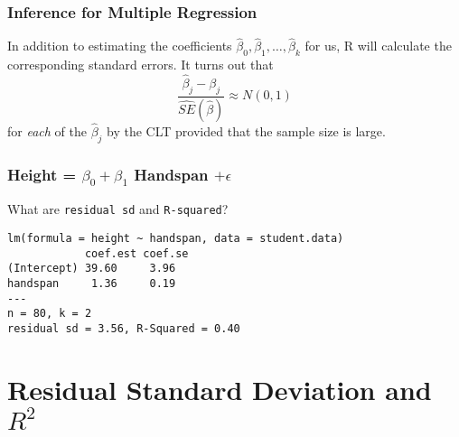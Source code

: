 \begin{frame}
\frametitle{Inference for Multiple Regression}

In addition to estimating the coefficients $\widehat{\beta}_0, \widehat{\beta}_1, \hdots, \widehat{\beta}_k$ for us, R will calculate the corresponding standard errors. It turns out that
	$$\frac{\widehat{\beta}_j - \beta_j}{\widehat{SE}(\widehat{\beta})} \approx N(0,1)$$
for \emph{each} of the $\widehat{\beta}_j$ by the CLT provided that the sample size is large.

\end{frame}

\begin{frame}[fragile]
\frametitle{Height = $\beta_0 + \beta_1$ Handspan $+ \epsilon$}
\alert{What are \texttt{residual sd} and \texttt{R-squared}?}
\footnotesize
\begin{verbatim}
lm(formula = height ~ handspan, data = student.data)
            coef.est coef.se
(Intercept) 39.60     3.96  
handspan     1.36     0.19  
---
n = 80, k = 2
residual sd = 3.56, R-Squared = 0.40
\end{verbatim}
\end{frame}
\section{Residual Standard Deviation and $R^2$}

